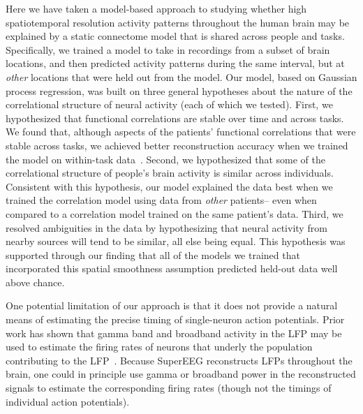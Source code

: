 \documentclass[11pt]{article}
\begin{document}
Here we have taken a model-based approach to studying whether high
spatiotemporal resolution activity patterns throughout the human brain
may be explained by a static connectome model that is shared across
people and tasks.  Specifically, we trained a model to take in
recordings from a subset of brain locations, and then predicted
activity patterns during the same interval, but at \textit{other}
locations that were held out from the model.  Our model, based on
Gaussian process regression, was built on three general hypotheses
about the nature of the correlational structure of neural activity
(each of which we tested).  First, we hypothesized that functional
correlations are stable over time and across tasks.  We found that,
although aspects of the patients' functional correlations that were
stable across tasks, we achieved better reconstruction accuracy when
we trained the model on within-task data~\citep[we acknowledge that
our general approach could potentially be extended to better model
across-task changes, following][and others]{ColeEtal16, TavoEtal16}.
Second, we hypothesized that some of the correlational structure of
people's brain activity is similar across individuals.  Consistent
with this hypothesis, our model explained the data best when we
trained the correlation model using data from \textit{other}
patients-- even when compared to a correlation model trained on the
same patient's data.  Third, we resolved ambiguities in the data by
hypothesizing that neural activity from nearby sources will tend to be
similar, all else being equal.  This hypothesis was supported through
our finding that all of the models we trained that incorporated this
spatial smoothness assumption predicted held-out data well above chance.

One potential limitation of our approach is that it does not provide a
natural means of estimating the precise timing of single-neuron action
potentials.  Prior work has shown that gamma band and broadband
activity in the LFP may be used to estimate the firing rates of
neurons that underly the population contributing to the
LFP~\cite{MillEtal08, MannEtal09, JacoEtal10, CronEtal11}.  Because
SuperEEG reconstructs LFPs throughout the brain, one could in
principle use gamma or broadband power in the reconstructed signals to
estimate the corresponding firing rates (though not the timings of
individual action potentials).
\end{document}
